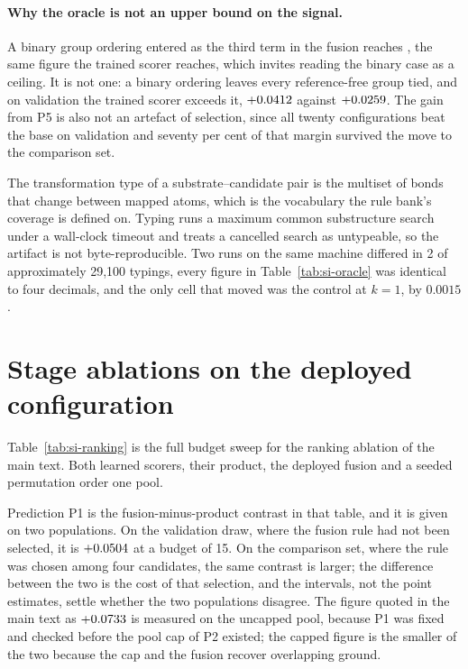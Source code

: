 \documentclass[journal=jcisd8,manuscript=suppinfo,layout=onecolumn]{achemso}
\begin{document}
\paragraph{Why the oracle is not an upper bound on the signal.} A binary group ordering entered
as the third term in the fusion reaches \numHOneTwoCeilingrecall{}, the same figure the trained
scorer reaches, which invites reading the binary case as a ceiling. It is not one: a binary
ordering leaves every reference-free group tied, and on validation the trained scorer exceeds it,
$+0.0412$ against $+0.0259$. The gain from P5 is also not an artefact of
selection, since all twenty configurations beat the base on validation and seventy per cent of
that margin survived the move to the comparison set.

The transformation type of a substrate--candidate pair is the multiset of bonds that change
between mapped atoms, which is the vocabulary the rule bank's coverage is defined on. Typing runs
a maximum common substructure search under a wall-clock timeout and treats a cancelled search as
untypeable, so the artifact is not byte-reproducible. Two runs on the same machine differed in
2 of approximately 29,100 typings, every figure in Table~\ref{tab:si-oracle} was identical to four
decimals, and the only cell that moved was the control at $k=1$, by $0.0015$.

\section{Stage ablations on the deployed configuration}
\label{sec:si-ablations}



Table~\ref{tab:si-ranking} is the full budget sweep for the ranking ablation of the main text.
Both learned scorers, their product, the deployed fusion and a seeded permutation order one pool.

Prediction P1 is the fusion-minus-product contrast in that table, and it is given on two
populations. On the validation draw, where the fusion rule had not been selected, it is
$+0.0504$ at a budget of 15. On the comparison set, where the rule was chosen among
four candidates, the same contrast is larger; the difference between the two is the cost of that
selection, and the intervals, not the point estimates, settle whether the two
populations disagree. The figure quoted in the main text as $+0.0733$ is measured on the
uncapped pool, because P1 was fixed and checked before the pool cap of P2 existed; the capped
figure is the smaller of the two because the cap and the fusion recover overlapping ground.
\end{document}
